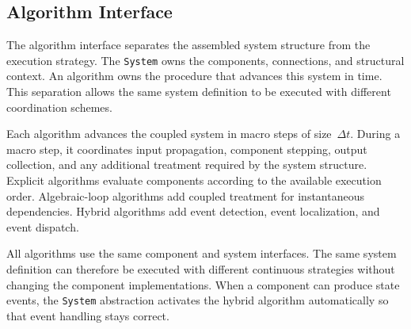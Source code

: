 \subsection{Algorithm Interface}
\label{sec:arch_algorithm}

The algorithm interface separates the assembled system structure from the execution strategy.
The \texttt{System} owns the components, connections, and structural context.
An algorithm owns the procedure that advances this system in time.
This separation allows the same system definition to be executed with different coordination schemes.

Each algorithm advances the coupled system in macro steps of size~$\Delta t$.
During a macro step, it coordinates input propagation, component stepping, output collection, and any additional treatment required by the system structure.
Explicit algorithms evaluate components according to the available execution order.
Algebraic-loop algorithms add coupled treatment for instantaneous dependencies.
Hybrid algorithms add event detection, event localization, and event dispatch.

All algorithms use the same component and system interfaces.
The same system definition can therefore be executed with different continuous strategies without changing the component implementations.
When a component can produce state events, the \texttt{System} abstraction activates the hybrid algorithm automatically so that event handling stays correct.
